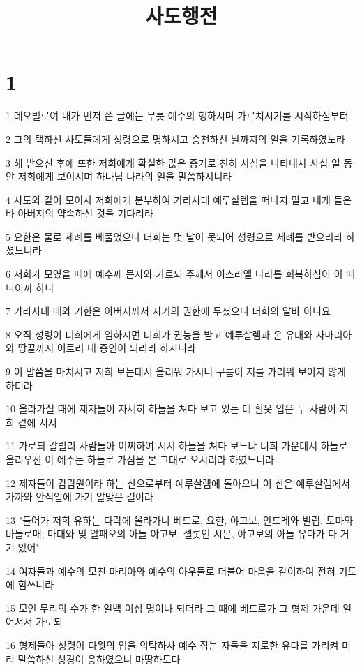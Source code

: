 

\title{사도행전}


\chapter{1}

\par 1 데오빌로여 내가 먼저 쓴 글에는 무릇 예수의 행하시며 가르치시기를 시작하심부터
\par 2 그의 택하신 사도들에게 성령으로 명하시고 승천하신 날까지의 일을 기록하였노라
\par 3 해 받으신 후에 또한 저희에게 확실한 많은 증거로 친히 사심을 나타내사 사십 일 동안 저희에게 보이시며 하나님 나라의 일을 말씀하시니라
\par 4 사도와 같이 모이사 저희에게 분부하여 가라사대 예루살렘을 떠나지 말고 내게 들은바 아버지의 약속하신 것을 기다리라
\par 5 요한은 물로 세례를 베풀었으나 너희는 몇 날이 못되어 성령으로 세례를 받으리라 하셨느니라
\par 6 저희가 모였을 때에 예수께 묻자와 가로되 주께서 이스라엘 나라를 회복하심이 이 때니이까 하니
\par 7 가라사대 때와 기한은 아버지께서 자기의 권한에 두셨으니 너희의 알바 아니요
\par 8 오직 성령이 너희에게 임하시면 너희가 권능을 받고 예루살렘과 온 유대와 사마리아와 땅끝까지 이르러 내 증인이 되리라 하시니라
\par 9 이 말씀을 마치시고 저희 보는데서 올리워 가시니 구름이 저를 가리워 보이지 않게 하더라
\par 10 올라가실 때에 제자들이 자세히 하늘을 쳐다 보고 있는 데 흰옷 입은 두 사람이 저희 곁에 서서
\par 11 가로되 갈릴리 사람들아 어찌하여 서서 하늘을 쳐다 보느냐 너희 가운데서 하늘로 올리우신 이 예수는 하늘로 가심을 본 그대로 오시리라 하였느니라
\par 12 제자들이 감람원이라 하는 산으로부터 예루살렘에 돌아오니 이 산은 예루살렘에서 가까와 안식일에 가기 알맞은 길이라
\par 13 "들어가 저희 유하는 다락에 올라가니 베드로, 요한, 야고보, 안드레와 빌립, 도마와 바돌로매, 마태와 및 알패오의 아들 야고보, 셀롯인 시몬, 야고보의 아들 유다가 다 거기 있어"
\par 14 여자들과 예수의 모친 마리아와 예수의 아우들로 더불어 마음을 같이하여 전혀 기도에 힘쓰니라
\par 15 모인 무리의 수가 한 일백 이십 명이나 되더라 그 때에 베드로가 그 형제 가운데 일어서서 가로되
\par 16 형제들아 성령이 다윗의 입을 의탁하사 예수 잡는 자들을 지로한 유다를 가리켜 미리 말씀하신 성경이 응하였으니 마땅하도다
